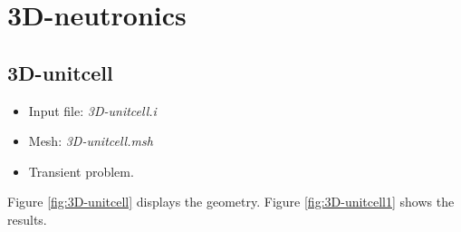 \documentclass[11pt,letterpaper]{article}
\begin{document}
\section{3D-neutronics}

\subsection{3D-unitcell}

	\begin{itemize}
		\item Input file: \textit{3D-unitcell.i}
		\item Mesh: \textit{3D-unitcell.msh}
		\item Transient problem.
	\end{itemize}

Figure \ref{fig:3D-unitcell} displays the geometry.
Figure \ref{fig:3D-unitcell1} shows the results.
\end{document}
